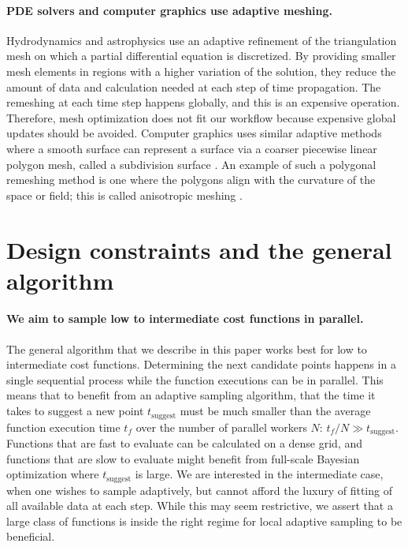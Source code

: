 \documentclass[english, twocolumn, 10pt, aps, superscriptaddress, floatfix, prb, citeautoscript]{revtex4-1}
\renewcommand{\citep}{\cite}
\begin{document}
\paragraph{PDE solvers and computer graphics use adaptive meshing.}

Hydrodynamics \citep{Berger1989, Berger1984} and astrophysics \citep{Klein1999} use an adaptive refinement of the triangulation mesh on which a partial differential equation is discretized.
By providing smaller mesh elements in regions with a higher variation of the solution, they reduce the amount of data and calculation needed at each step of time propagation.
The remeshing at each time step happens globally, and this is an expensive operation.
Therefore, mesh optimization does not fit our workflow because expensive global updates should be avoided.
Computer graphics uses similar adaptive methods where a smooth surface can represent a surface via a coarser piecewise linear polygon mesh, called a subdivision surface \citep{DeRose1998}.
An example of such a polygonal remeshing method is one where the polygons align with the curvature of the space or field; this is called anisotropic meshing \citep{Alliez2003}.

\hypertarget{sec:design}{%
\section{Design constraints and the general algorithm}\label{sec:design}}

\paragraph{We aim to sample low to intermediate cost functions in parallel.}

The general algorithm that we describe in this paper works best for low to intermediate cost functions.
Determining the next candidate points happens in a single sequential process while the function executions can be in parallel.
This means that to benefit from an adaptive sampling algorithm, that the time it takes to suggest a new point \(t_\textrm{suggest}\) must be much smaller than the average function execution time \(t_f\) over the number of parallel workers \(N\): \(t_f / N \gg t_\textrm{suggest}\).
Functions that are fast to evaluate can be calculated on a dense grid, and functions that are slow to evaluate might benefit from full-scale Bayesian optimization where \(t_\textrm{suggest}\) is large.
We are interested in the intermediate case, when one wishes to sample adaptively, but cannot afford the luxury of fitting of all available data at each step.
While this may seem restrictive, we assert that a large class of functions is inside the right regime for local adaptive sampling to be beneficial.
\end{document}
